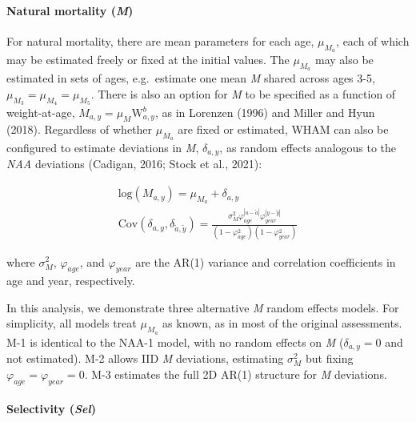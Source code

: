 \documentclass[]{article}
\let\oldparagraph\paragraph
\renewcommand{\paragraph}[1]{\oldparagraph{#1}\mbox{}}
\begin{document}
\hypertarget{natural-mortality-m}{%
\paragraph{\texorpdfstring{Natural mortality
(\emph{M})}{Natural mortality (M)}}\label{natural-mortality-m}}

For natural mortality, there are mean parameters for each age,
\(\mu_{M_a}\), each of which may be estimated freely or fixed at the
initial values. The \(\mu_{M_a}\) may also be estimated in sets of ages,
e.g.~estimate one mean \emph{M} shared across ages 3-5,
\(\mu_{M_3} = \mu_{M_4} = \mu_{M_5}\). There is also an option for
\emph{M} to be specified as a function of weight-at-age,
\(M_{a,y} = \mu_M \text{W}^b_{a,y}\), as in Lorenzen (1996) and Miller
and Hyun (2018). Regardless of whether \(\mu_{M_a}\) are fixed or
estimated, WHAM can also be configured to estimate deviations in
\emph{M}, \(\delta_{a,y}\), as random effects analogous to the
\emph{NAA} deviations (Cadigan, 2016; Stock et al., 2021):

\begin{equation}
  \begin{array}{cc}
    \text{log}\left( M_{a,y} \right) = \mu_{M_a} + \delta_{a,y} \\
    \text{Cov} \left( \delta_{a,y}, \delta_{\tilde{a},\tilde{y}} \right) = \frac{\sigma^2_M \varphi^{|a-\tilde{a}|}_{age} \varphi^{|y-\tilde{y}|}_{year}}{\left(1-\varphi^2_{age}\right) \left(1-\varphi^2_{year}\right)}
  \end{array}
\end{equation}

where \(\sigma^2_M\), \(\varphi_{age}\), and \(\varphi_{year}\) are the
AR(1) variance and correlation coefficients in age and year,
respectively.

In this analysis, we demonstrate three alternative \emph{M} random
effects models. For simplicity, all models treat \(\mu_{M_a}\) as known,
as in most of the original assessments. M-1 is identical to the NAA-1
model, with no random effects on \emph{M} (\(\delta_{a,y} = 0\) and not
estimated). M-2 allows IID \emph{M} deviations, estimating
\(\sigma^2_M\) but fixing \(\varphi_{age} = \varphi_{year} = 0\). M-3
estimates the full 2D AR(1) structure for \emph{M} deviations.

\hypertarget{selectivity-sel}{%
\paragraph{\texorpdfstring{Selectivity
(\emph{Sel})}{Selectivity (Sel)}}\label{selectivity-sel}}
\end{document}
